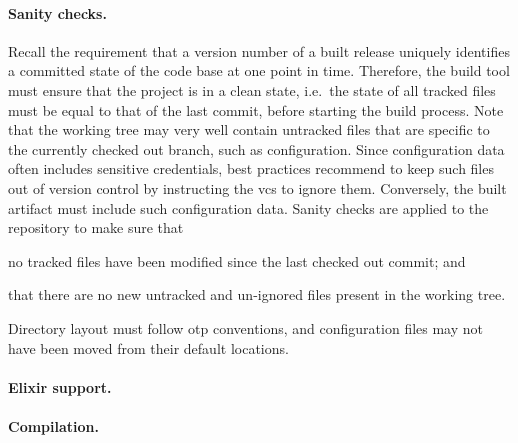 \paragraph{Sanity checks.} Recall the requirement that a version number of a built release uniquely identifies a committed state of the code base at one point in time. Therefore, the build tool must ensure that the project is in a clean state, i.e.~the state of all tracked files must be equal to that of the last commit, before starting the build process. Note that the working tree may very well contain untracked files that are specific to the currently checked out branch, such as configuration. Since configuration data often includes sensitive credentials, best practices recommend to keep such files out of version control by instructing the \acrshort{vcs} to ignore them. Conversely, the built artifact must include such configuration data. Sanity checks are applied to the repository to make sure that \begin{enumerate*}[label=(\roman*)]
  \item no tracked files have been modified since the last checked out commit; and
  \item that there are no new untracked and un-ignored files present in the working tree.
\end{enumerate*}
Directory layout must follow \acrshort{otp} conventions, and configuration files may not have been moved from their default locations.

\paragraph{Elixir support.}


\paragraph{Compilation.}

